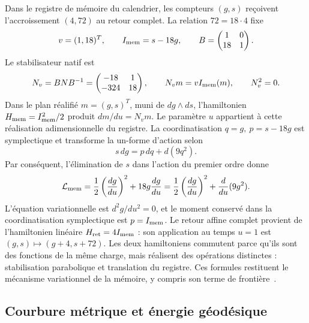Dans le registre de mémoire du calendrier, les compteurs \((g,s)\)
reçoivent l’accroissement \((4,72)\) au retour complet. La relation
\(72=18\cdot4\) fixe
\[
 v=(1,18)^T,\qquad I_{\rm mem}=s-18g,
 \qquad B=\begin{pmatrix}1&0\\18&1\end{pmatrix}.
\]
Le stabilisateur natif est
\begin{equation}
 N_v=BNB^{-1}=
 \begin{pmatrix}-18&1\\-324&18\end{pmatrix},\qquad
 N_vm=vI_{\rm mem}(m),\qquad N_v^2=0.
 \label{eq:hc-nv}
\end{equation}
Dans le plan réalifié \(m=(g,s)^T\), muni de \(dg\wedge ds\), l'hamiltonien \(H_{\rm mem}=I_{\rm mem}^2/2\) produit \(dm/du=N_vm\). Le paramètre \(u\) appartient à cette réalisation adimensionnelle du registre. La coordinatisation \(q=g,\ p=s-18g\) est symplectique et transforme la un-forme d'action selon
\begin{equation}
 s\,dg=p\,dq+d(9q^2).
 \label{eq:hc-memoria-borde}
\end{equation}
Par conséquent, l’élimination de \(s\) dans l’action du premier ordre donne
\begin{equation}
 \mathcal L_{\rm mem}
 =\frac12\left(\frac{dg}{du}\right)^2
 +18g\frac{dg}{du}
 =\frac12\left(\frac{dg}{du}\right)^2
 +\frac{d}{du}(9g^2).
 \label{eq:hc-lmem}
\end{equation}
L'équation variationnelle est \(d^2g/du^2=0\), et le moment conservé dans la coordinatisation symplectique est \(p=I_{\rm mem}\). Le retour affine complet provient de l'hamiltonien linéaire \(H_{\rm ret}=4I_{\rm mem}\) : son application au temps \(u=1\) est \((g,s)\mapsto(g+4,s+72)\). Les deux hamiltoniens commutent parce qu'ils sont des fonctions de la même charge, mais réalisent des opérations distinctes : stabilisation parabolique et translation du registre. Ces formules restituent le mécanisme variationnel de la mémoire, y compris son terme de frontière~\cite{hmtX}.

\subsection{Courbure métrique et énergie géodésique}

